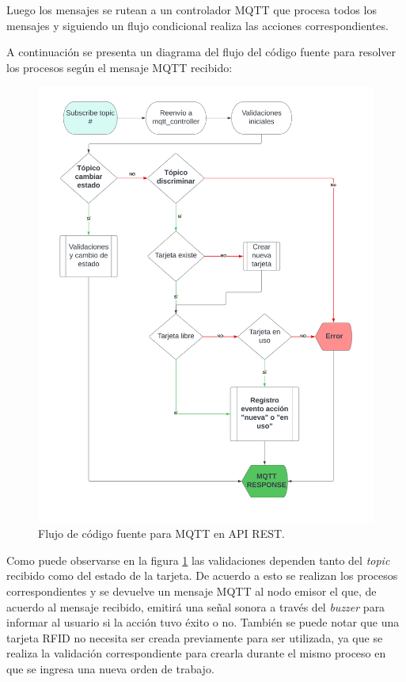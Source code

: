 Luego los mensajes se rutean a un controlador MQTT que procesa todos los mensajes y siguiendo un flujo condicional realiza las acciones correspondientes.

A continuación se presenta un diagrama del flujo del código fuente para resolver los procesos según el mensaje MQTT recibido:

\begin{figure}[H]
	\centering
	\includegraphics[width=\textwidth]{./Figures/mqtt-controller-api-2.png}
	\caption{Flujo de código fuente para MQTT en API REST.}
	\label{fig:mqttcontrollerapi}
\end{figure}

Como puede observarse en la figura \ref{fig:mqttcontrollerapi} las validaciones dependen tanto del \textit{topic} recibido como del estado de la tarjeta. De acuerdo a esto se realizan los procesos correspondientes y se devuelve un mensaje MQTT al nodo emisor el que, de acuerdo al mensaje recibido, emitirá una señal sonora a través del \textit{buzzer} para informar al usuario si la acción tuvo éxito o no. También se puede notar que una tarjeta RFID no necesita ser creada previamente para ser utilizada, ya que se realiza la validación correspondiente para crearla durante el mismo proceso en que se ingresa una nueva orden de trabajo.



